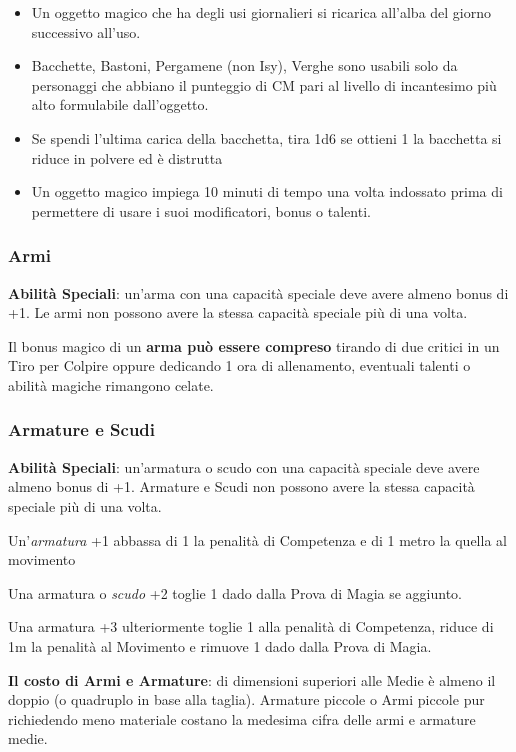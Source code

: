 \begin{multicols}{2}
\begin{itemize}[leftmargin=*]
\item 
Un oggetto magico che ha degli usi giornalieri si ricarica all'alba del giorno successivo all'uso.
\item 
Bacchette, Bastoni, Pergamene (non Isy), Verghe sono usabili solo da personaggi che abbiano il punteggio di CM pari al livello di incantesimo più alto formulabile dall'oggetto.
\item 
Se spendi l'ultima carica della bacchetta, tira 1d6 se ottieni 1 la bacchetta si riduce in polvere ed è distrutta
\item 
Un oggetto magico impiega 10 minuti di tempo una volta indossato prima di permettere di usare i suoi modificatori, bonus o talenti.

\end{itemize}

\subsubsection{Armi}

\textbf{Abilità Speciali}: un'arma con una capacità speciale deve avere almeno bonus di +1. Le armi non possono avere la stessa capacità speciale più di una volta.

Il bonus magico di un \textbf{arma può essere compreso} tirando di due critici in un Tiro per Colpire oppure dedicando 1 ora di allenamento, eventuali talenti o abilità magiche rimangono celate.

\subsubsection{Armature e Scudi}

\textbf{Abilità Speciali}: un'armatura o scudo con una capacità speciale deve avere almeno bonus di +1. Armature e Scudi non possono avere la stessa capacità speciale più di una volta.

Un'\emph{armatura} +1 abbassa di 1 la penalità di Competenza e di 1 metro la quella al movimento

Una armatura o \emph{scudo} +2 toglie 1 dado dalla Prova di Magia se aggiunto. 

Una armatura +3 ulteriormente toglie 1 alla penalità di Competenza, riduce di 1m la penalità al Movimento e rimuove 1 dado dalla Prova di Magia.

\textbf{Il costo di Armi e Armature}: di dimensioni superiori alle Medie è almeno il doppio (o quadruplo in base alla taglia). Armature piccole o Armi piccole pur richiedendo meno materiale costano la medesima cifra delle armi e armature medie.


\end{multicols}
